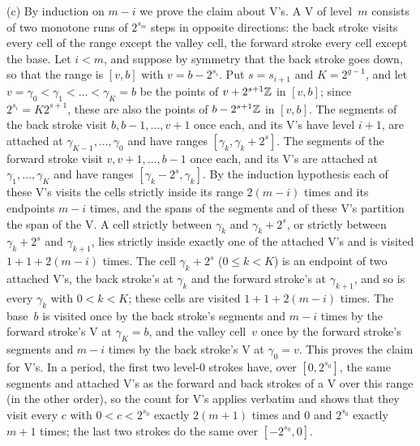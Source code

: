 \begin{informalproof}
(c) By induction on $m-i$ we prove the claim about V's. A V of level~$m$ consists of two monotone runs of $2^{s_m}$
steps in opposite directions: the back stroke visits every cell of the range except the valley cell, the forward
stroke every cell except the base. Let $i<m$, and suppose by symmetry that the back stroke goes down, so that the
range is $[v,b]$ with $v=b-2^{s_i}$. Put $s=s_{i+1}$ and $K=2^{g-1}$, and let $v=\gamma_0<\gamma_1<\dots<\gamma_K=b$
be the points of $v+2^{s+1}\mathbb{Z}$ in $[v,b]$; since $2^{s_i}=K2^{s+1}$, these are also the points of $b-2^{s+1}\mathbb{Z}$ in
$[v,b]$. The segments of the back stroke visit $b,b-1,\dots,v+1$ once each, and its V's have level $i+1$, are attached
at $\gamma_{K-1},\dots,\gamma_0$ and have ranges $[\gamma_k,\gamma_k+2^s]$. The segments of the forward stroke visit
$v,v+1,\dots,b-1$ once each, and its V's are attached at $\gamma_1,\dots,\gamma_K$ and have ranges
$[\gamma_k-2^s,\gamma_k]$. By the induction hypothesis each of these V's visits the cells strictly inside its range
$2(m-i)$ times and its endpoints $m-i$ times, and the spans of the segments and of these V's partition the span of the
V. A cell strictly between $\gamma_k$ and $\gamma_k+2^s$, or strictly between $\gamma_k+2^s$ and $\gamma_{k+1}$, lies
strictly inside exactly one of the attached V's and is visited $1+1+2(m-i)$ times. The cell $\gamma_k+2^s$
($0\le k<K$) is an endpoint of two attached V's, the back stroke's at $\gamma_k$ and the forward stroke's at
$\gamma_{k+1}$, and so is every $\gamma_k$ with $0<k<K$; these cells are visited $1+1+2(m-i)$ times. The base~$b$ is
visited once by the back stroke's segments and $m-i$ times by the forward stroke's V at $\gamma_K=b$, and the valley
cell~$v$ once by the forward stroke's segments and $m-i$ times by the back stroke's V at $\gamma_0=v$. This proves
the claim for V's. In a period, the first two level-$0$ strokes have, over $[0,2^{s_0}]$, the same segments and
attached V's as the forward and back strokes of a V over this range (in the other order), so the count for V's applies
verbatim and shows that they visit every $c$ with $0<c<2^{s_0}$ exactly $2(m+1)$ times and $0$ and $2^{s_0}$ exactly $m+1$
times; the last two strokes do the same over $[-2^{s_0},0]$.


\end{informalproof}
